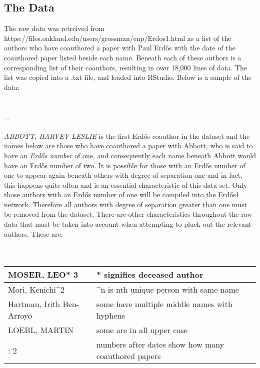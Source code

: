 \documentclass[17pt]{extarticle}
\begin{document}
\subsection{The Data}
\indent The raw data was retreived from https://files.oakland.edu/users/grossman/enp/Erdos1.html as a list of the authors who have coauthored a paper with Paul Erd\H{o}s with the date of the coauthored paper listed beside each name. Beneath each of these authors is a corresponding list of their coauthors, resulting in over 18,000 lines of data. The list was copied into a .txt file, and loaded into RStudio. Below is a  sample of the data:\\
  \\
  \\
  \indent ...\\
  \\
\indent \textit{ABBOTT, HARVEY LESLIE} is the first Erd\H{o}s coauthor in the dataset and the names below are those who have coauthored a paper with Abbott, who is said to have an \textit{Erd\H{o}s number} of one, and consequently each name beneath Abbott would have an Erd\H{o}s number of two. It is possible for those with an Erd\H{o}s number of one to appear again beneath others with degree of separation one and in fact, this happens quite often and is an essential characteristic of this data set. Only those authors with an Erd\H{o}s number of one will be compiled into the Erd\H{o}s1 network. Therefore all authors with degree of separation greater than one must be removed from the dataset. There are other characteristics throughout the raw data that must be taken into account when attempting to pluck out the relevant authors. These are:\\
\\
\\
\begin{tabular}{| >{\centering\arraybackslash}m{3.65in} | >{\centering\arraybackslash}m{3.65in} |}
\hline
    MOSER, LEO*    3 &  * signifies deceased author  \\
\hline
    Mori, Kenichi\textasciicircum 2 &\textasciicircum n is nth unique person with same name \\
\hline
    Hartman, Irith Ben-Arroyo & some have multiple middle names with hyphens \\
\hline
    LOEBL, MARTIN & some are in all upper case \\
\hline
  1944:  2 & numbers after dates show how many coauthored papers \\
\hline
\end{tabular}
\end{document}
